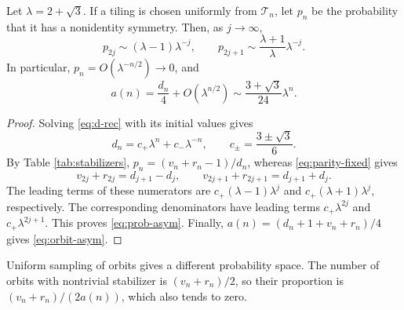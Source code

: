 \begin{theorem}\label{thm:asym}
Let $\lambda=2+\sqrt3$. If a tiling is chosen uniformly from
$\mathcal T_n$, let $p_n$ be the probability that it has a
nonidentity symmetry. Then, as $j\to\infty$,
\begin{equation}\label{eq:prob-asym}
 p_{2j}\sim(\lambda-1)\lambda^{-j},\qquad
 p_{2j+1}\sim\frac{\lambda+1}{\lambda}\lambda^{-j}.
\end{equation}
In particular, $p_n=O(\lambda^{-n/2})\to0$, and
\begin{equation}\label{eq:orbit-asym}
 a(n)=\frac{d_n}{4}+O(\lambda^{n/2})
 \sim\frac{3+\sqrt3}{24}\lambda^n.
\end{equation}
\end{theorem}
\begin{proof}
Solving \eqref{eq:d-rec} with its initial values gives
\begin{equation}\label{eq:d-closed}
 d_n=c_+\lambda^n+c_-\lambda^{-n},\qquad
 c_\pm=\frac{3\pm\sqrt3}{6}.
\end{equation}
By Table \ref{tab:stabilizers},
$p_n=(v_n+r_n-1)/d_n$, whereas \eqref{eq:parity-fixed} gives
\[
 v_{2j}+r_{2j}=d_{j+1}-d_j,\qquad
 v_{2j+1}+r_{2j+1}=d_{j+1}+d_j.
\]
The leading terms of these numerators are
$c_+(\lambda-1)\lambda^j$ and $c_+(\lambda+1)\lambda^j$,
respectively. The corresponding denominators have leading
terms $c_+\lambda^{2j}$ and $c_+\lambda^{2j+1}$.
This proves \eqref{eq:prob-asym}. Finally,
$a(n)=(d_n+1+v_n+r_n)/4$ gives \eqref{eq:orbit-asym}.
\end{proof}

Uniform sampling of orbits gives a different probability
space. The number of orbits with nontrivial stabilizer is
$(v_n+r_n)/2$, so their proportion is
$(v_n+r_n)/(2a(n))$, which also tends to zero.
